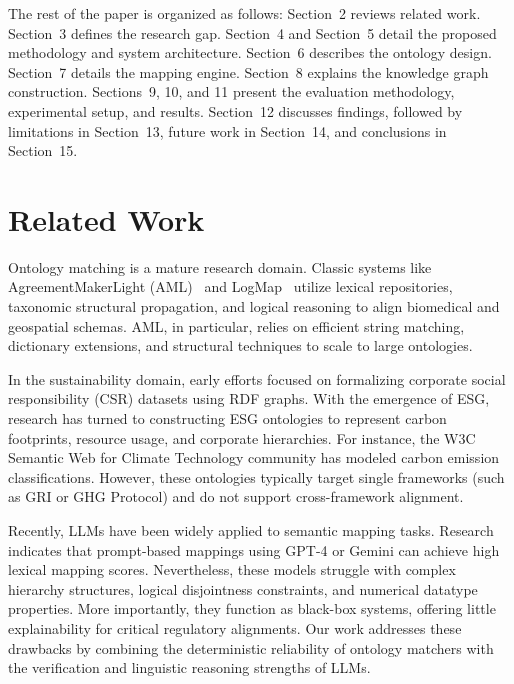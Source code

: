 \documentclass[journal,compsoc]{IEEEtran}
\begin{document}

The rest of the paper is organized as follows: Section~2 reviews related work. Section~3 defines the research gap. Section~4 and Section~5 detail the proposed methodology and system architecture. Section~6 describes the ontology design. Section~7 details the mapping engine. Section~8 explains the knowledge graph construction. Sections~9, 10, and 11 present the evaluation methodology, experimental setup, and results. Section~12 discusses findings, followed by limitations in Section~13, future work in Section~14, and conclusions in Section~15.

\section{Related Work}
Ontology matching is a mature research domain. Classic systems like AgreementMakerLight (AML)~\cite{aml2013} and LogMap~\cite{logmap2011} utilize lexical repositories, taxonomic structural propagation, and logical reasoning to align biomedical and geospatial schemas. AML, in particular, relies on efficient string matching, dictionary extensions, and structural techniques to scale to large ontologies.

In the sustainability domain, early efforts focused on formalizing corporate social responsibility (CSR) datasets using RDF graphs. With the emergence of ESG, research has turned to constructing ESG ontologies to represent carbon footprints, resource usage, and corporate hierarchies. For instance, the W3C Semantic Web for Climate Technology community has modeled carbon emission classifications. However, these ontologies typically target single frameworks (such as GRI or GHG Protocol) and do not support cross-framework alignment.

Recently, LLMs have been widely applied to semantic mapping tasks. Research indicates that prompt-based mappings using GPT-4 or Gemini can achieve high lexical mapping scores. Nevertheless, these models struggle with complex hierarchy structures, logical disjointness constraints, and numerical datatype properties. More importantly, they function as black-box systems, offering little explainability for critical regulatory alignments. Our work addresses these drawbacks by combining the deterministic reliability of ontology matchers with the verification and linguistic reasoning strengths of LLMs.
\end{document}

